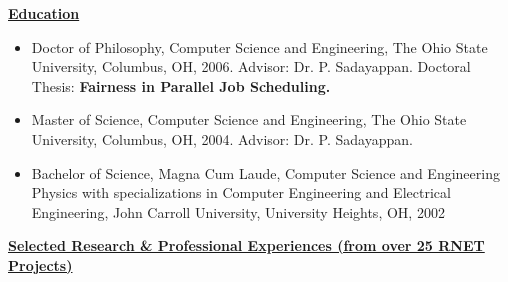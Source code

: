 {\bf{\underline{Education}}}
 
 \begin{itemize}
 	\item Doctor of Philosophy, Computer Science and Engineering, The
 	Ohio State University, Columbus, OH, 2006. Advisor:
 	Dr. P. Sadayappan. Doctoral Thesis: \textbf{Fairness in Parallel Job
 		Scheduling.}
 	\item Master of Science, Computer Science and Engineering, The Ohio
 	State University, Columbus, OH, 2004. Advisor: Dr. P. Sadayappan.
 	\item Bachelor of Science, Magna Cum Laude, Computer Science and
 	Engineering Physics with specializations in Computer Engineering and
 	Electrical Engineering, John Carroll University, University Heights,
 	OH, 2002
 \end{itemize}
 
 {\bf {\underline{Selected Research \& Professional Experiences (from over 25 RNET Projects)}}}
 
